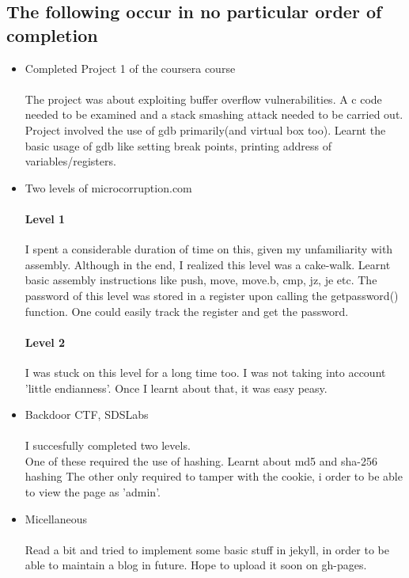 \documentclass{article}
\begin{document}
\subsection*{The following occur in no particular order of completion}
\begin{itemize}
    \item Completed Project 1 of the coursera course
        \paragraph{}
        The project was about exploiting buffer overflow vulnerabilities. A c code needed to be examined and a stack smashing attack needed to be carried out. Project involved the use of gdb primarily(and virtual box too). Learnt the basic usage of gdb like setting break points, printing address of variables/registers.
    \item Two levels of microcorruption.com
        \paragraph{Level 1}
        I spent a considerable duration of time on this, given my unfamiliarity with assembly. Although in the end, I realized this level was a cake-walk. Learnt basic assembly instructions like push, move, move.b, cmp, jz, je etc. The password of this level was stored in a register upon calling the getpassword() function. One could easily track the register and get the password.
        \paragraph{Level 2}
        I was stuck on this level for a long time too. I was not taking into account 'little endianness'. Once I learnt about that, it was easy peasy.
    \item Backdoor CTF, SDSLabs
        \paragraph{}
        I succesfully completed two levels.
        \\
        One of these required the use of hashing. Learnt about md5 and sha-256 hashing
        The other only required to tamper with the cookie, i order to be able to view the page as 'admin'.
    \item Micellaneous
        \paragraph{}
        Read a bit and tried to implement some basic stuff in jekyll, in order to be able to maintain a blog in future. Hope to upload it soon on gh-pages.
\end{itemize}
\end{document}
